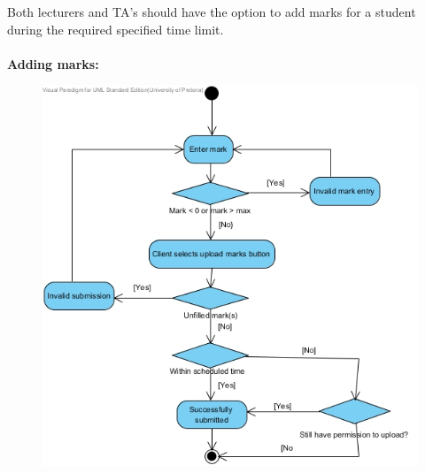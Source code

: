 \documentclass[12pt,a4paper]{article}
\begin{document}
\newpage
\newpage
Both lecturers and TA’s should have the option to add marks for a student during the required specified time limit.\\
\\
\textbf {Adding marks:}
\begin{figure}[h]
\begin{center}
\includegraphics[scale=0.7]{./AndroidActivityDiagrams/ActivityDiagram5}
\end{center}
\end{figure}
\end{document}
